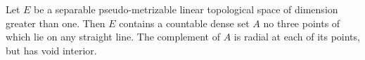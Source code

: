 Let $E$ be a separable pseudo-metrizable linear topological space of dimension greater than one. Then $E$ contains a countable dense set $A$ no three points of which lie on any straight line. The complement of $A$ is radial at each of its points, but has void interior.
